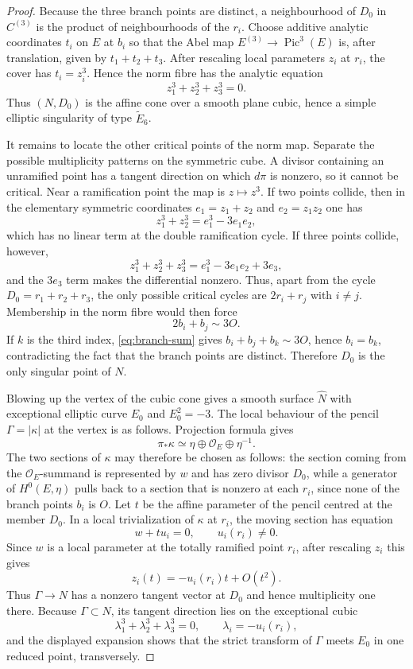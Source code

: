 \documentclass[10pt]{amsart}
\numberwithin{equation}{section}
\theoremstyle{definition}
\theoremstyle{remark}
\newcommand{\wt}{\widetilde}
\begin{document}
\begin{proof}
Because the three branch points are distinct, a neighbourhood of $D_0$ in
$C^{(3)}$ is the product of neighbourhoods of the $r_i$.  Choose additive
analytic coordinates $t_i$ on $E$ at $b_i$ so that the Abel map
$E^{(3)}\to\operatorname{Pic}^3(E)$ is, after translation, given by
$t_1+t_2+t_3$.  After rescaling local parameters $z_i$ at $r_i$, the cover
has $t_i=z_i^3$.  Hence the norm fibre has the analytic equation
\[
 z_1^3+z_2^3+z_3^3=0.
\]
Thus $(N,D_0)$ is the affine cone over a smooth plane cubic, hence a simple
elliptic singularity of type $\wt E_6$.

It remains to locate the other critical points of the norm map.  Separate
the possible multiplicity patterns on the symmetric cube.  A divisor
containing an unramified point
has a tangent direction on which $d\pi$ is nonzero, so it cannot be critical.
Near a ramification point the map is $z\mapsto z^3$.  If two points collide,
then in the elementary symmetric coordinates $e_1=z_1+z_2$ and
$e_2=z_1z_2$ one has
\[
 z_1^3+z_2^3=e_1^3-3e_1e_2,
\]
which has no linear term at the double ramification cycle.  If three points
collide, however,
\[
 z_1^3+z_2^3+z_3^3=e_1^3-3e_1e_2+3e_3,
\]
and the $3e_3$ term makes the differential nonzero.  Thus, apart from the
cycle $D_0=r_1+r_2+r_3$, the only possible critical cycles are
$2r_i+r_j$ with $i\ne j$.  Membership in the norm fibre would then force
\[
 2b_i+b_j\sim3O.
\]
If $k$ is the third index, \eqref{eq:branch-sum} gives
$b_i+b_j+b_k\sim3O$, hence $b_i=b_k$, contradicting the fact that the branch
points are distinct.  Therefore $D_0$ is the only singular point of $N$.

Blowing up the vertex of the cubic cone gives a smooth surface $\widehat N$
with exceptional elliptic curve $E_0$ and $E_0^2=-3$.  The local behaviour
of the pencil $\Gamma=|\kappa|$ at the vertex is as follows.  Projection
formula gives
\[
 \pi_*\kappa\simeq\eta\oplus\mathcal O_E\oplus\eta^{-1}.
\]
The two sections of $\kappa$ may therefore be chosen as follows: the section
coming from the $\mathcal O_E$-summand is represented by $w$ and has zero
divisor $D_0$, while a generator of $H^0(E,\eta)$ pulls back to a section
that is nonzero at each $r_i$, since none of the branch points $b_i$ is $O$.  Let $t$ be the affine parameter of the pencil
centred at the member $D_0$.  In a local trivialization of $\kappa$ at
$r_i$, the moving section has equation
\[
 w+t u_i=0,\qquad u_i(r_i)\ne0.
\]
Since $w$ is a local parameter at the totally ramified point $r_i$, after
rescaling $z_i$ this gives
\[
 z_i(t)=-u_i(r_i)t+O(t^2).
\]
Thus $\Gamma\to N$ has a nonzero tangent vector at $D_0$ and hence
multiplicity one there.  Because $\Gamma\subset N$, its tangent direction
lies on the exceptional cubic
\[
 \lambda_1^3+\lambda_2^3+\lambda_3^3=0,
 \qquad \lambda_i=-u_i(r_i),
\]
and the displayed expansion shows that the strict transform of $\Gamma$
meets $E_0$ in one reduced point, transversely.


\end{proof}
\end{document}
